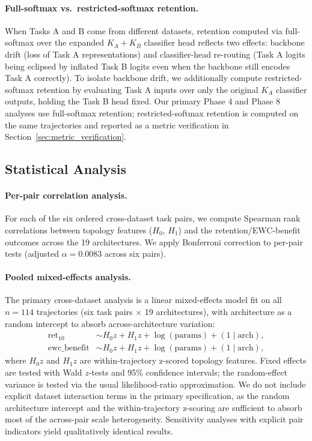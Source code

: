 \documentclass[10pt,twocolumn]{article}
\begin{document}
\paragraph{Full-softmax vs.\ restricted-softmax retention.}
When Tasks A and B come from different datasets, retention computed via full-softmax over the expanded $K_A + K_B$ classifier head reflects two effects: backbone drift (loss of Task A representations) and classifier-head re-routing (Task A logits being eclipsed by inflated Task B logits even when the backbone still encodes Task A correctly). To isolate backbone drift, we additionally compute restricted-softmax retention by evaluating Task A inputs over only the original $K_A$ classifier outputs, holding the Task B head fixed. Our primary Phase 4 and Phase 8 analyses use full-softmax retention; restricted-softmax retention is computed on the same trajectories and reported as a metric verification in Section~\ref{sec:metric_verification}.

\subsection{Statistical Analysis}
\label{sec:stats}

\paragraph{Per-pair correlation analysis.}
For each of the six ordered cross-dataset task pairs, we compute Spearman rank correlations between topology features ($H_0$, $H_1$) and the retention/EWC-benefit outcomes across the 19 architectures. We apply Bonferroni correction to per-pair tests (adjusted $\alpha = 0.0083$ across six pairs).

\paragraph{Pooled mixed-effects analysis.}
The primary cross-dataset analysis is a linear mixed-effects model fit on all $n = 114$ trajectories (six task pairs $\times$ 19 architectures), with architecture as a random intercept to absorb across-architecture variation:
\begin{align*}
    \text{ret}_{10} &\sim H_0 z + H_1 z + \log(\text{params}) + (1 \mid \text{arch}), \\
    \text{ewc\_benefit} &\sim H_0 z + H_1 z + \log(\text{params}) + (1 \mid \text{arch}),
\end{align*}
where $H_0 z$ and $H_1 z$ are within-trajectory z-scored topology features. Fixed effects are tested with Wald $z$-tests and 95\% confidence intervals; the random-effect variance is tested via the usual likelihood-ratio approximation. We do not include explicit dataset interaction terms in the primary specification, as the random architecture intercept and the within-trajectory z-scoring are sufficient to absorb most of the across-pair scale heterogeneity. Sensitivity analyses with explicit pair indicators yield qualitatively identical results.
\end{document}
